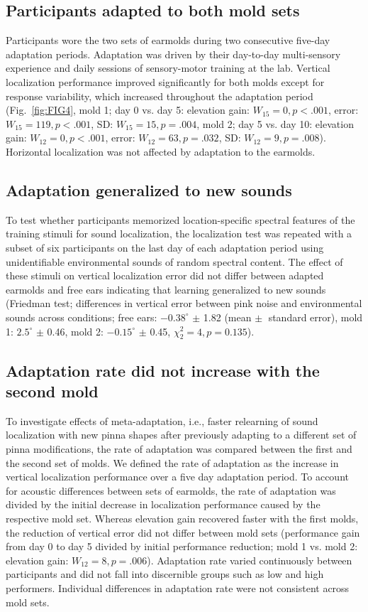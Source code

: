 \documentclass[preprint]{JASA}
\begin{document}
\subsection{Participants adapted to both mold sets}
Participants wore the two sets of earmolds during two consecutive five-day adaptation periods. Adaptation was driven by their day-to-day multi-sensory experience and daily sessions of sensory-motor training at the lab. Vertical localization performance improved significantly for both molds except for response variability, which increased throughout the adaptation period (Fig.~\ref{fig:FIG4}, mold 1; day 0 vs. day 5: elevation gain: $W_{15} = 0, p < .001$, error: $W_{15} = 119, p < .001$, SD: $W_{15} = 15, p = .004$, mold 2; day 5 vs. day 10: elevation gain: $W_{12} = 0, p < .001$, error: $W_{12} = 63, p = .032$, SD: $W_{12} = 9, p = .008$). Horizontal localization was not affected by adaptation to the earmolds. 

\subsection{Adaptation generalized to new sounds}
To test whether participants memorized location-specific spectral features of the training stimuli for sound localization, the localization test was repeated with a subset of six participants on the last day of each adaptation period using unidentifiable environmental sounds of random spectral content. The effect of these stimuli on vertical localization error did not differ between adapted earmolds and free ears indicating that learning generalized to new sounds (Friedman test; differences in vertical error between pink noise and environmental sounds across conditions; free ears: $-0.38^\circ$ $\pm$ 1.82 (mean $\pm$ standard error), mold 1: $2.5^\circ$ $\pm$ 0.46, mold 2: $-0.15^\circ$ $\pm$ 0.45, $\chi^2_2 = 4, p = 0.135$).

\subsection{Adaptation rate did not increase with the second mold}
To investigate effects of meta-adaptation, i.e., faster relearning of sound localization with new pinna shapes after previously adapting to a different set of pinna modifications, the rate of adaptation was compared between the first and the second set of molds. We defined the rate of adaptation as the increase in vertical localization performance over a five day adaptation period. To account for acoustic differences between sets of earmolds, the rate of adaptation was divided by the initial decrease in localization performance caused by the respective mold set. Whereas elevation gain recovered faster with the first molds, the reduction of vertical error did not differ between mold sets (performance gain from day 0 to day 5 divided by initial performance reduction; mold 1 vs. mold 2: elevation gain: $W_{12} = 8, p = .006$). Adaptation rate varied continuously between participants and did not fall into discernible groups such as low and high performers. Individual differences in adaptation rate were not consistent across mold sets.
\end{document}
